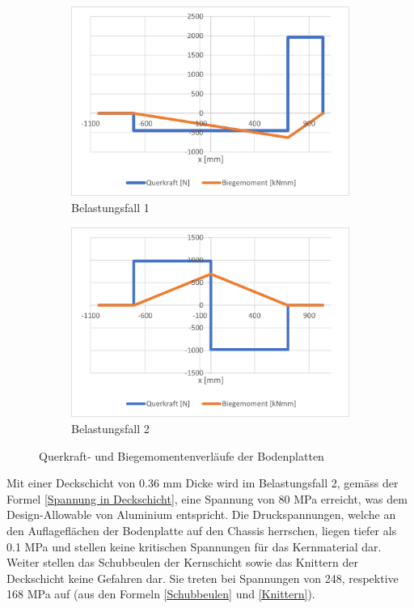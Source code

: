 \begin{figure}[!ht]
  \centering
    \begin{subfigure}{.5\textwidth}
      \centering
      \includegraphics[width=.98\linewidth]{04_figures/Boden QM1.png}
      \caption{Belastungsfall 1}
      \label{Boden QM1}
    \end{subfigure}%
    \begin{subfigure}{.5\textwidth}
      \centering
      \includegraphics[width=.98\linewidth]{04_figures/Boden QM2.png}
      \caption{Belastungsfall 2}
      \label{Boden QM2}
    \end{subfigure}%
  \caption{Querkraft- und Biegemomentenverläufe der Bodenplatten}
\label{Boden QM}
\end{figure}

Mit einer Deckschicht von 0.36 mm Dicke wird im Belastungsfall 2, gemäss der Formel \ref{Spannung in Deckschicht}, eine Spannung von 80 MPa erreicht, was dem Design-Allowable von Aluminium entspricht. Die Druckspannungen, welche an den Auflageflächen der Bodenplatte auf den Chassis herrschen, liegen tiefer als 0.1 MPa und stellen keine kritischen Spannungen für das Kernmaterial dar. Weiter stellen das Schubbeulen der Kernschicht sowie das Knittern der Deckschicht keine Gefahren dar. Sie treten bei Spannungen von 248, respektive 168 MPa auf (aus den Formeln \ref{Schubbeulen} und \ref{Knittern}).\\

